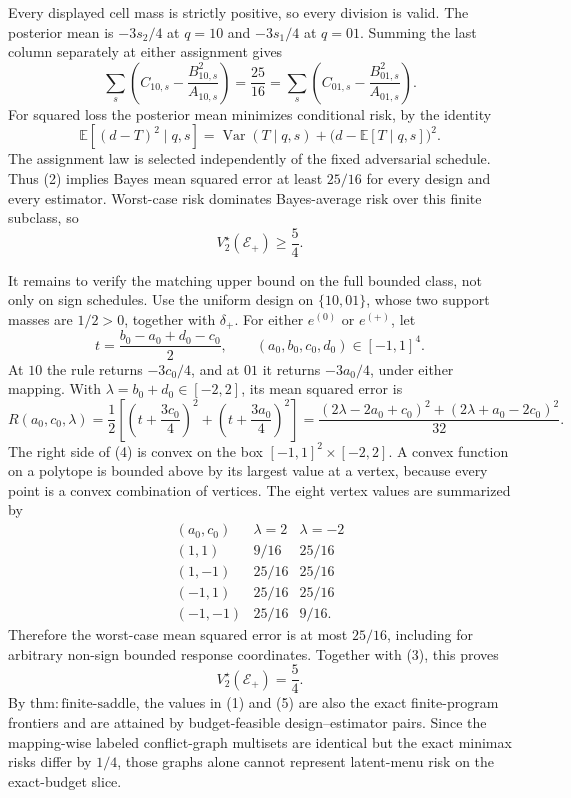 Every displayed cell mass is strictly positive, so every division is valid.
The posterior mean is \(-3s_2/4\) at \(q=10\) and \(-3s_1/4\) at
\(q=01\).  Summing the last column separately at either assignment gives
\[
 \sum_s\left(C_{10,s}-\frac{B_{10,s}^2}{A_{10,s}}\right)
 =\frac{25}{16}
 =\sum_s\left(C_{01,s}-\frac{B_{01,s}^2}{A_{01,s}}\right). \tag{2}
\]
For squared loss the posterior mean minimizes conditional risk, by the
identity
\[
 \mathbb E[(d-T)^2\mid q,s]
 =\operatorname{Var}(T\mid q,s)
  +\bigl(d-\mathbb E[T\mid q,s]\bigr)^2.
\]
The assignment law is selected independently of the fixed adversarial
schedule.  Thus (2) implies Bayes mean squared error at least \(25/16\) for
every design and every estimator.  Worst-case risk dominates Bayes-average
risk over this finite subclass, so
\[
 V_2^\star(\mathcal E_+)\ge\frac54. \tag{3}
\]

It remains to verify the matching upper bound on the full bounded class, not
only on sign schedules.  Use the uniform design on \(\{10,01\}\), whose two
support masses are \(1/2>0\), together with \(\delta_+\).  For either
\(e^{(0)}\) or \(e^{(+)}\), let
\[
 t=\frac{b_0-a_0+d_0-c_0}{2},
 \qquad (a_0,b_0,c_0,d_0)\in[-1,1]^4.
\]
At \(10\) the rule returns \(-3c_0/4\), and at \(01\) it returns
\(-3a_0/4\), under either mapping.  With \(\lambda=b_0+d_0\in[-2,2]\),
its mean squared error is
\[
 R(a_0,c_0,\lambda)
 =\frac12\left[\left(t+\frac{3c_0}{4}\right)^2
                 +\left(t+\frac{3a_0}{4}\right)^2\right]
 =\frac{(2\lambda-2a_0+c_0)^2+(2\lambda+a_0-2c_0)^2}{32}. \tag{4}
\]
The right side of (4) is convex on the box
\([-1,1]^2\times[-2,2]\).  A convex function on a polytope is bounded above
by its largest value at a vertex, because every point is a convex combination
of vertices.  The eight vertex values are summarized by
\[
\begin{array}{c|cc}
(a_0,c_0)&\lambda=2&\lambda=-2\\ \hline
(1,1)&9/16&25/16\\
(1,-1)&25/16&25/16\\
(-1,1)&25/16&25/16\\
(-1,-1)&25/16&9/16.
\end{array}
\]
Therefore the worst-case mean squared error is at most \(25/16\), including
for arbitrary non-sign bounded response coordinates.  Together with (3),
this proves
\[
 V_2^\star(\mathcal E_+)=\frac54. \tag{5}
\]
By \(\mathrm{thm{:}finite\text{-}saddle}\), the values in (1) and (5) are
also the exact finite-program frontiers and are attained by budget-feasible
design--estimator pairs.  Since the mapping-wise labeled conflict-graph
multisets are identical but the exact minimax risks differ by \(1/4\), those
graphs alone cannot represent latent-menu risk on the exact-budget slice.